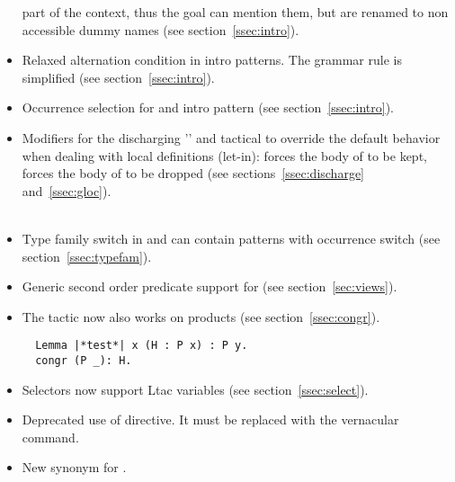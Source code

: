 \begin{itemize}
      part of the context, thus the goal can mention them, but are
      renamed to non accessible dummy names (see section~\ref{ssec:intro}).\\
\item Relaxed alternation condition in intro patterns. The
       grammar rule is simplified (see section~\ref{ssec:intro}).\\
\item Occurrence selection for \ssrC{->} and \ssrC{<-} intro pattern
       (see section~\ref{ssec:intro}).\\
\item Modifiers for the discharging '\ssrC{:}' and  tactical to override
      the default behavior when dealing with local definitions (let-in):
       forces the body of  to be kept,  forces the body of
       to be dropped  (see sections~\ref{ssec:discharge}
      and~\ref{ssec:gloc}).\\
      \\
\item Type family switch in  and 
      can contain patterns with occurrence switch
      (see section~\ref{ssec:typefam}).\\
\item Generic second order predicate support for 
      (see section~\ref{sec:views}).\\
\item The  tactic now also works on products (see
      section~\ref{ssec:congr}).
\begin{lstlisting}
  Lemma |*test*| x (H : P x) : P y.
  congr (P _): H.
\end{lstlisting}
\item Selectors now support Ltac variables
      (see section~\ref{ssec:select}).\\
\item Deprecated use of  directive.
      It must be replaced with the \Coq{}  vernacular command.
\item New synonym  for .
\end{itemize}
